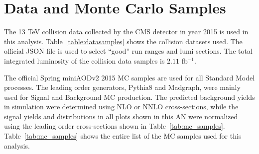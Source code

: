 \section{Data and Monte Carlo Samples}\label{sec:samples}


The 13 TeV collision data collected by the CMS detector in year 2015 is used in this analysis. Table~\ref{table:datasamples} shows the collision datasets used. 
 The official JSON file is used to select ``good'' run ranges and lumi sections. The total integrated luminosity of the collision data samples is $2.11$ fb$^{-1}$.

The official Spring miniAODv2 2015 MC samples are used for all Standard Model processes. The leading order generators, {\sc Pythia8} and {\sc Madgraph}, were 
mainly used for Signal and Background MC production. The predicted background yields in simulation were determined using NLO or NNLO cross-sections, while the 
signal yields and distributions in all plots shown in this AN were normalized using the leading order cross-sections shown in Table~\ref{tab:mc_samples}. 
Table~\ref{tab:mc_samples} shows the entire list of the MC samples used for this analysis. 


